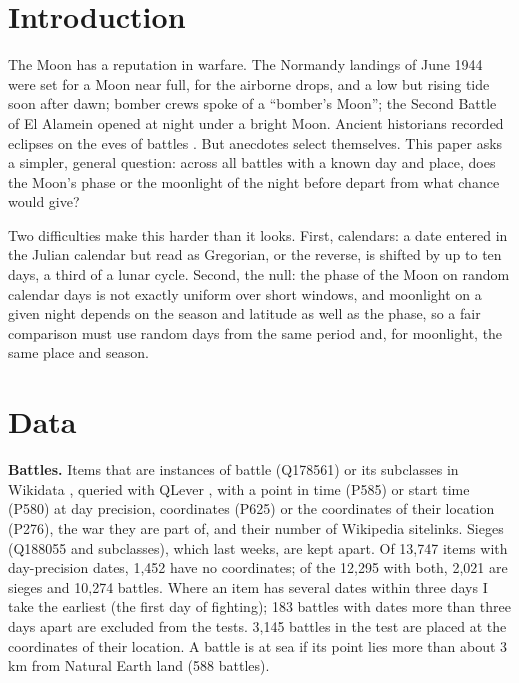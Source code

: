 \documentclass[11pt,a4paper]{article}
\begin{document}
\section{Introduction}
The Moon has a reputation in warfare. The Normandy landings of June 1944 were set for a Moon near full, for the airborne drops, and a low but rising tide soon after dawn; bomber crews spoke of a ``bomber's Moon''; the Second Battle of El Alamein opened at night under a bright Moon. Ancient historians recorded eclipses on the eves of battles \citep{livy,herodotus}. But anecdotes select themselves. This paper asks a simpler, general question: across all battles with a known day and place, does the Moon's phase or the moonlight of the night before depart from what chance would give?

Two difficulties make this harder than it looks. First, calendars: a date entered in the Julian calendar but read as Gregorian, or the reverse, is shifted by up to ten days, a third of a lunar cycle. Second, the null: the phase of the Moon on random calendar days is not exactly uniform over short windows, and moonlight on a given night depends on the season and latitude as well as the phase, so a fair comparison must use random days from the same period and, for moonlight, the same place and season.

\section{Data}
\textbf{Battles.} Items that are instances of battle (Q178561) or its subclasses in Wikidata \citep{wikidata}, queried with QLever \citep{qlever}, with a point in time (P585) or start time (P580) at day precision, coordinates (P625) or the coordinates of their location (P276), the war they are part of, and their number of Wikipedia sitelinks. Sieges (Q188055 and subclasses), which last weeks, are kept apart. Of 13,747 items with day-precision dates, 1,452 have no coordinates; of the 12,295 with both, 2,021 are sieges and 10,274 battles. Where an item has several dates within three days I take the earliest (the first day of fighting); 183 battles with dates more than three days apart are excluded from the tests. 3,145 battles in the test are placed at the coordinates of their location. A battle is at sea if its point lies more than about 3 km from Natural Earth land (588 battles).
\end{document}
